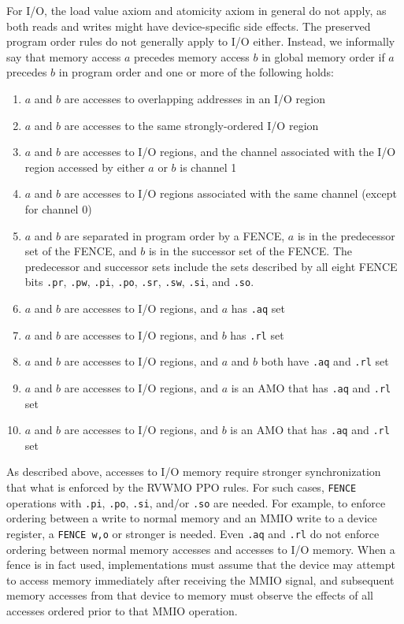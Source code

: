 For I/O, the load value axiom and atomicity axiom in general do not apply, as both reads and writes might have device-specific side effects.
The preserved program order rules do not generally apply to I/O either.
Instead, we informally say that memory access $a$ precedes memory access $b$ in global memory order if $a$ precedes $b$ in program order and one or more of the following holds:
\begin{enumerate}
  \item $a$ and $b$ are accesses to overlapping addresses in an I/O region
  \item $a$ and $b$ are accesses to the same strongly-ordered I/O region
  \item $a$ and $b$ are accesses to I/O regions, and the channel associated with the I/O region accessed by either $a$ or $b$ is channel 1
  \item $a$ and $b$ are accesses to I/O regions associated with the same channel (except for channel 0)
  \item $a$ and $b$ are separated in program order by a FENCE, $a$ is in the predecessor set of the FENCE, and $b$ is in the successor set of the FENCE.  The predecessor and successor sets include the sets described by all eight FENCE bits {\tt .pr}, {\tt .pw}, {\tt .pi}, {\tt .po}, {\tt .sr}, {\tt .sw}, {\tt .si}, and {\tt .so}.
  \item $a$ and $b$ are accesses to I/O regions, and $a$ has {\tt .aq} set
  \item $a$ and $b$ are accesses to I/O regions, and $b$ has {\tt .rl} set
  \item $a$ and $b$ are accesses to I/O regions, and $a$ and $b$ both have {\tt .aq} and {\tt .rl} set
  \item $a$ and $b$ are accesses to I/O regions, and $a$ is an AMO that has {\tt .aq} and {\tt .rl} set
  \item $a$ and $b$ are accesses to I/O regions, and $b$ is an AMO that has {\tt .aq} and {\tt .rl} set
\end{enumerate}

As described above, accesses to I/O memory require stronger synchronization that what is enforced by the RVWMO PPO rules.
For such cases, {\tt FENCE} operations with {\tt .pi}, {\tt .po}, {\tt .si}, and/or {\tt .so} are needed.
For example, to enforce ordering between a write to normal memory and an MMIO write to a device register, a {\tt FENCE w,o} or stronger is needed.
Even {\tt .aq} and {\tt .rl} do not enforce ordering between normal memory accesses and accesses to I/O memory.
When a fence is in fact used, implementations must assume that the device may attempt to access memory immediately after receiving the MMIO signal, and subsequent memory accesses from that device to memory must observe the effects of all accesses ordered prior to that MMIO operation.

